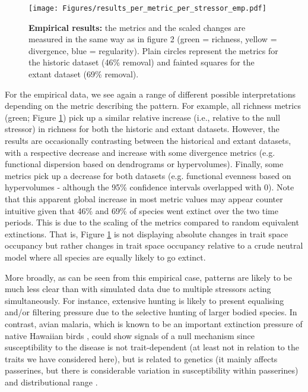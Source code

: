 \documentclass[12pt,letterpaper]{article}
\begin{document}
\begin{figure}[!htbp]
\centering
   \texttt{[image: Figures/results\_per\_metric\_per\_stressor\_emp.pdf]}
\caption{\scriptsize{\textbf{Empirical results:} the metrics and the scaled changes are measured in the same way as in figure 2 (green = richness, yellow = divergence, blue = regularity).
Plain circles represent the metrics for the historic dataset (46\% removal) and fainted squares for the extant dataset (69\% removal).
}}
\label{Fig:empirical_results}
\end{figure}
\bigskip

For the empirical data, we see again a range of different possible interpretations depending on the metric describing the pattern.
For example, all richness metrics (green; Figure \ref{Fig:empirical_results}) pick up a similar relative increase (i.e., relative to the null stressor) in richness for both the historic and extant datasets.
However, the results are occasionally contrasting between the historical and extant datasets, with a respective decrease and increase with some divergence metrics (e.g. functional dispersion based on dendrograms or hypervolumes).
Finally, some metrics pick up a decrease for both datasets (e.g. functional evenness based on hypervolumes - although the 95\% confidence intervals overlapped with 0).
Note that this apparent global increase in most metric values may appear counter intuitive given that 46\% and 69\% of species went extinct over the two time periods.
This is due to the scaling of the metrics compared to random equivalent extinctions.
That is, Figure \ref{Fig:empirical_results} is not displaying absolute changes in trait space occupancy but rather changes in trait space occupancy relative to a crude neutral model where all species are equally likely to go extinct.

More broadly, as can be seen from this empirical case, patterns are likely to be much less clear than with simulated data due to multiple stressors acting simultaneously.
For instance, extensive hunting is likely to present equalising and/or filtering pressure due to the selective hunting of larger bodied species.
In contrast, avian malaria, which is known to be an important extinction pressure of native Hawaiian birds \citep{samuel2011dynamics}, could show signals of a null mechanism since susceptibility to the disease is not trait-dependent (at least not in relation to the traits we have considered here), but is related to genetics (it mainly affects passerines, but there is considerable variation in susceptibility within passerines) and distributional range \citep{jessup2023wildlife}.
\end{document}
